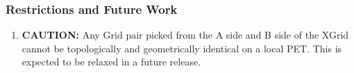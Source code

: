 
\subsubsection{Restrictions and Future Work}

\begin{enumerate}
\label{XGrid:rest}

\item {\bf CAUTION:} Any Grid pair picked from the A side and B side of the XGrid cannot be topologically and geometrically identical on a local PET. This is expected to
be relaxed in a future release. 

\end{enumerate}



